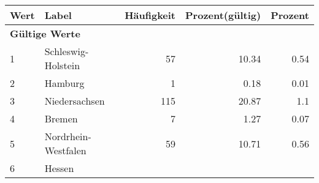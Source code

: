      \begin{longtable}{lXrrr}
     \toprule
     \textbf{Wert} & \textbf{Label} & \textbf{Häufigkeit} & \textbf{Prozent(gültig)} & \textbf{Prozent} \\
     \endhead
     \midrule
     \multicolumn{5}{l}{\textbf{Gültige Werte}}\\

     1 &
     \multicolumn{1}{X}{ Schleswig-Holstein   } &


       \num{57} &
       \num[round-mode=places,round-precision=2]{10,34} &
         \num[round-mode=places,round-precision=2]{0,54} \\

     2 &
     \multicolumn{1}{X}{ Hamburg   } &


       \num{1} &
       \num[round-mode=places,round-precision=2]{0,18} &
         \num[round-mode=places,round-precision=2]{0,01} \\

     3 &
     \multicolumn{1}{X}{ Niedersachsen   } &


       \num{115} &
       \num[round-mode=places,round-precision=2]{20,87} &
         \num[round-mode=places,round-precision=2]{1,1} \\

     4 &
     \multicolumn{1}{X}{ Bremen   } &


       \num{7} &
       \num[round-mode=places,round-precision=2]{1,27} &
         \num[round-mode=places,round-precision=2]{0,07} \\

     5 &
     \multicolumn{1}{X}{ Nordrhein-Westfalen   } &


       \num{59} &
       \num[round-mode=places,round-precision=2]{10,71} &
         \num[round-mode=places,round-precision=2]{0,56} \\

     6 &
     \multicolumn{1}{X}{ Hessen   } &



\end{longtable}
